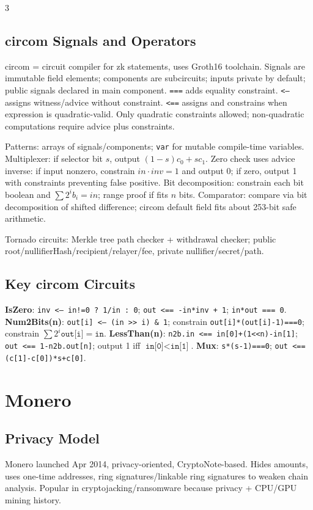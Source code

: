 \documentclass[8pt]{extarticle}
\newcommand{\term}[1]{\textbf{#1}}
\begin{document}
\begin{multicols*}{3}
\subsection{circom Signals and Operators}
circom = circuit compiler for zk statements, uses Groth16 toolchain. Signals are immutable field elements; components are subcircuits; inputs private by default; public signals declared in main component. \texttt{===} adds equality constraint. \texttt{<--} assigns witness/advice without constraint. \texttt{<==} assigns and constrains when expression is quadratic-valid. Only quadratic constraints allowed; non-quadratic computations require advice plus constraints.

Patterns: arrays of signals/components; \texttt{var} for mutable compile-time variables. Multiplexer: if selector bit $s$, output $(1-s)c_0+s c_1$. Zero check uses advice inverse: if input nonzero, constrain $in\cdot inv=1$ and output 0; if zero, output 1 with constraints preventing false positive. Bit decomposition: constrain each bit boolean and $\sum 2^i b_i=in$; range proof if fits $n$ bits. Comparator: compare via bit decomposition of shifted difference; circom default field fits about 253-bit safe arithmetic.

Tornado circuits: Merkle tree path checker + withdrawal checker; public root/nullifierHash/recipient/relayer/fee, private nullifier/secret/path.

\subsection{Key circom Circuits}
\term{IsZero}: \texttt{inv <-- in!=0 ? 1/in : 0}; \texttt{out <== -in*inv + 1}; \texttt{in*out === 0}. \term{Num2Bits(n)}: \texttt{out[i] <-- (in >> i) \& 1}; constrain \texttt{out[i]*(out[i]-1)===0}; constrain $\sum2^i\texttt{out[i]}=\texttt{in}$. \term{LessThan(n)}: \texttt{n2b.in <== in[0]+(1<<n)-in[1]}; \texttt{out <== 1-n2b.out[n]}; output 1 iff $\texttt{in[0]}<\texttt{in[1]}$. \term{Mux}: \texttt{s*(s-1)===0}; \texttt{out <== (c[1]-c[0])*s+c[0]}.

\section{Monero}
\subsection{Privacy Model}
Monero launched Apr 2014, privacy-oriented, CryptoNote-based. Hides amounts, uses one-time addresses, ring signatures/linkable ring signatures to weaken chain analysis. Popular in cryptojacking/ransomware because privacy + CPU/GPU mining history.


\end{multicols*}
\end{document}
